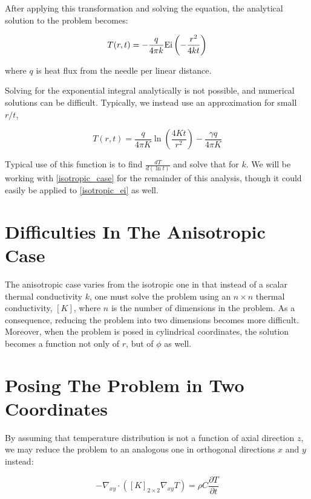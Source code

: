 After applying this transformation and solving the equation, the analytical solution to the problem becomes:

\begin{equation}
\label{isotropic_ei}
T(r,t) = - \frac{q}{4\pi k}\textrm{Ei}\left(-\frac{r^2}{4kt}\right)
\end{equation}

where \(q\) is heat flux from the needle per linear distance.

Solving for the exponential integral analytically is not possible, and numerical solutions can be difficult. Typically, we instead use an approximation for small \(r/t\),

\begin{equation}
\label{isotropic_case}
T(r,t) = \frac{q}{4\pi K}\ln\left(\frac{4Kt}{r^2}\right) - \frac{\gamma q}{4\pi K}
\end{equation}

Typical use of this function is to find \(\frac{dT}{d(\ln t)}\) and solve that for \(k\). We will be working with \ref{isotropic_case} for the remainder of this analysis, though it could easily be applied to \ref{isotropic_ei} as well.


\section{Difficulties In The Anisotropic Case}
\label{sec:analytical-np:anisotropic-diff}


The anisotropic case varies from the isotropic one in that instead of a scalar thermal conductivity \(k\), one must solve the problem using an \(n \times n\) thermal conductivity, \([K]\), where \(n\) is the number of dimensions in the problem. As a consequence, reducing the problem into two dimensions becomes more difficult. Moreover, when the problem is posed in cylindrical coordinates, the solution becomes a function not only of \(r\), but of \(\phi\) as well.

\section{Posing The Problem in Two Coordinates}
\label{sec:analytical-np:2D}

By assuming that temperature distribution is not a function of axial direction \(z\), we may reduce the problem to an analogous one in orthogonal directions \(x\) and \(y\) instead:

\begin{equation}
-\nabla_{xy} \cdot \left([K]_{2 \times 2}\nabla_{xy} T \right)= \rho C\frac{\partial T}{\partial t}
\end{equation}

